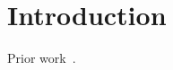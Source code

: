 \documentclass{article}
\begin{document}
\begin{abstract}We extend the surface code~\cite{kitaev,dennis} to new lattices.\end{abstract}
\section{Introduction}Prior work~\cite{a}.
\end{document}
